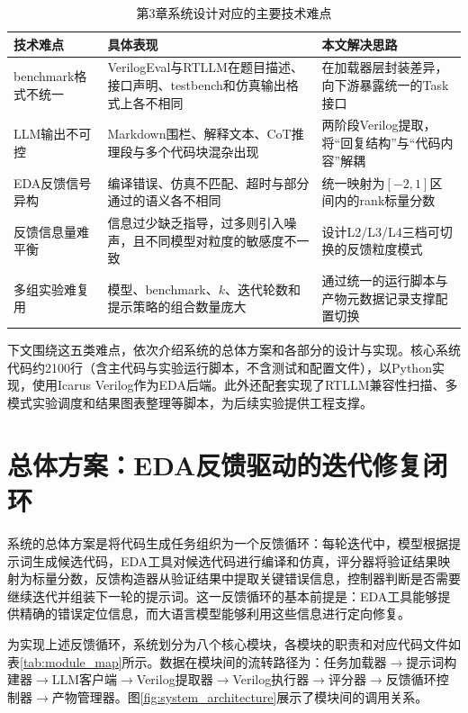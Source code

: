 \begin{table}[htbp]
\centering
\caption{第3章系统设计对应的主要技术难点}
\label{tab:design_challenges}
\begin{tabular}{p{2.6cm}p{4.6cm}p{5.4cm}}
\toprule
技术难点 & 具体表现 & 本文解决思路 \\
\midrule
benchmark格式不统一 & VerilogEval与RTLLM在题目描述、接口声明、testbench和仿真输出格式上各不相同 & 在加载器层封装差异，向下游暴露统一的Task接口 \\
LLM输出不可控 & Markdown围栏、解释文本、CoT推理段与多个代码块混杂出现 & 两阶段Verilog提取，将``回复结构''与``代码内容''解耦 \\
EDA反馈信号异构 & 编译错误、仿真不匹配、超时与部分通过的语义各不相同 & 统一映射为$[-2,1]$区间内的rank标量分数 \\
反馈信息量难平衡 & 信息过少缺乏指导，过多则引入噪声，且不同模型对粒度的敏感度不一致 & 设计L2/L3/L4三档可切换的反馈粒度模式 \\
多组实验难复用 & 模型、benchmark、$k$、迭代轮数和提示策略的组合数量庞大 & 通过统一的运行脚本与产物元数据记录支撑配置切换 \\
\bottomrule
\end{tabular}
\end{table}

下文围绕这五类难点，依次介绍系统的总体方案和各部分的设计与实现。核心系统代码约2100行（含主代码与实验运行脚本，不含测试和配置文件），以Python实现，使用Icarus Verilog\cite{iverilog}作为EDA后端。此外还配套实现了RTLLM兼容性扫描、多模式实验调度和结果图表整理等脚本，为后续实验提供工程支撑。

\section{总体方案：EDA反馈驱动的迭代修复闭环}

系统的总体方案是将代码生成任务组织为一个反馈循环：每轮迭代中，模型根据提示词生成候选代码，EDA工具对候选代码进行编译和仿真，评分器将验证结果映射为标量分数，反馈构造器从验证结果中提取关键错误信息，控制器判断是否需要继续迭代并组装下一轮的提示词。这一反馈循环的基本前提是：EDA工具能够提供精确的错误定位信息，而大语言模型能够利用这些信息进行定向修复。

为实现上述反馈循环，系统划分为八个核心模块，各模块的职责和对应代码文件如表\ref{tab:module_map}所示。数据在模块间的流转路径为：任务加载器$\rightarrow$提示词构建器$\rightarrow$LLM客户端$\rightarrow$Verilog提取器$\rightarrow$Verilog执行器$\rightarrow$评分器$\rightarrow$反馈循环控制器$\rightarrow$产物管理器。图\ref{fig:system_architecture}展示了模块间的调用关系。

